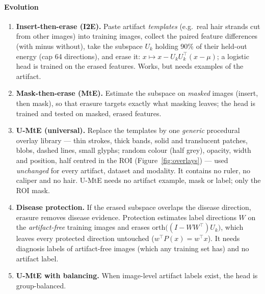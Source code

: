 \paragraph{Evolution}
\begin{enumerate}[leftmargin=*]\itemsep1pt
\item \textbf{Insert-then-erase (I2E).} Paste artifact \emph{templates} (e.g.\ real hair strands cut from other images)
into training images, collect the paired feature differences (with minus without), take the subspace $U_k$ holding 90\%
of their held-out energy (cap 64 directions), and erase it: $x\mapsto x-U_kU_k^\top(x-\mu)$; a logistic head is trained on
the erased features. Works, but needs examples of the artifact.
\item \textbf{Mask-then-erase (MtE).} Estimate the subspace on \emph{masked} images (insert, then mask), so that erasure
targets exactly what masking leaves; the head is trained and tested on masked, erased features.
\item \textbf{U-MtE (universal).} Replace the templates by one \emph{generic} procedural overlay library --- thin strokes,
thick bands, solid and translucent patches, blobs, dashed lines, small glyphs; random colour (half grey), opacity,
width and position, half centred in the ROI (Figure~\ref{fig:overlays}) --- used \emph{unchanged} for every artifact,
dataset and modality. It contains no ruler, no caliper and no hair. U-MtE needs no artifact example, mask or label; only
the ROI mask.
\item \textbf{Disease protection.} If the erased subspace overlaps the disease direction, erasure removes disease
evidence. Protection estimates label directions $W$ on the \emph{artifact-free} training images and erases
$\mathrm{orth}\big((I-WW^\top)U_k\big)$, which leaves every protected direction untouched ($w^\top P(x)=w^\top x$). It
needs diagnosis labels of artifact-free images (which any training set has) and no artifact label.
\item \textbf{U-MtE with balancing.} When image-level artifact labels exist, the head is group-balanced.
\end{enumerate}
